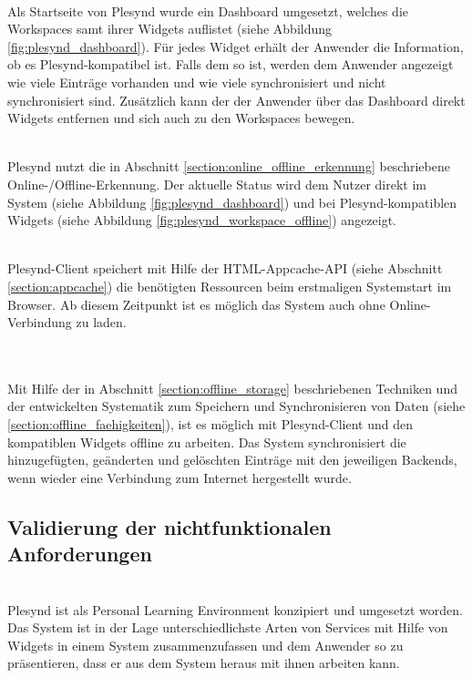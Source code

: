 \textbullet{}  \emph{\requirementDashboard}\\
Als Startseite von Plesynd wurde ein Dashboard umgesetzt, welches die Workspaces samt ihrer Widgets auflistet (siehe Abbildung \ref{fig:plesynd_dashboard}). Für jedes Widget erhält der Anwender die Information, ob es Plesynd-kompatibel ist. Falls dem so ist, werden dem Anwender angezeigt wie viele Einträge vorhanden und wie viele synchronisiert und nicht synchronisiert sind. Zusätzlich kann der der Anwender über das Dashboard direkt Widgets entfernen und sich auch zu den Workspaces bewegen.

\textbullet{}  \emph{\requirementCheckOnlineStatus}\\
Plesynd nutzt die in Abschnitt \ref{section:online_offline_erkennung} beschriebene Online-/Offline-Erkennung. Der aktuelle Status wird dem Nutzer direkt im System (siehe Abbildung \ref{fig:plesynd_dashboard}) und bei Plesynd-kompatiblen Widgets (siehe Abbildung \ref{fig:plesynd_workspace_offline}) angezeigt.

\textbullet{}  \emph{\requirementOfflineStart}\\
Plesynd-Client speichert mit Hilfe der HTML-Appcache-API (siehe Abschnitt \ref{section:appcache}) die benötigten Ressourcen beim erstmaligen Systemstart im Browser. Ab diesem Zeitpunkt ist es möglich das System auch ohne Online-Verbindung zu laden.

\textbullet{}  \emph{\requirementOfflineWork}\\
\textbullet{}  \emph{\requirementOnlineSync}\\
Mit Hilfe der in Abschnitt \ref{section:offline_storage} beschriebenen Techniken und der entwickelten Systematik zum Speichern und Synchronisieren von Daten (siehe \ref{section:offline_faehigkeiten}), ist es möglich mit Plesynd-Client und den kompatiblen Widgets offline zu arbeiten. Das System synchronisiert die hinzugefügten, geänderten und gelöschten Einträge mit den jeweiligen Backends, wenn wieder eine Verbindung zum Internet hergestellt wurde.

\subsection{Validierung der nichtfunktionalen Anforderungen}
\textbullet{}  \emph{\requirementAggregator}\\
Plesynd ist als Personal Learning Environment konzipiert und umgesetzt worden. Das System ist in der Lage unterschiedlichste Arten von Services mit Hilfe von Widgets in einem System zusammenzufassen und dem Anwender so zu präsentieren, dass er aus dem System heraus mit ihnen arbeiten kann.

